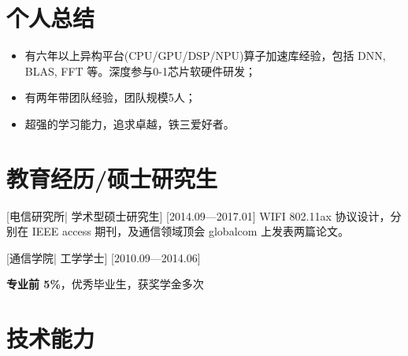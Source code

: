 \documentclass{resume}
\begin{document}


\ResumeTitle


\section{个人总结}

\begin{itemize}
  \item 有六年以上异构平台(CPU/GPU/DSP/NPU)算子加速库经验，包括 DNN, BLAS, FFT 等。深度参与0-1芯片软硬件研发；
  \item 有两年带团队经验，团队规模5人；
  \item 超强的学习能力，追求卓越，铁三爱好者。
\end{itemize}

\section{教育经历/硕士研究生}
[\textnormal{电信研究所|}  学术型硕士研究生]
[2014.09—2017.01]
WIFI 802.11ax 协议设计，分别在 IEEE access 期刊，及通信领域顶会 globalcom 上发表两篇论文。

\nocite{*} %
\printbibliography[heading={none}]



[\textnormal{通信学院|} 工学学士]
[2010.09—2014.06]

\textbf{专业前 5\%}，优秀毕业生，获奖学金多次

\section{技术能力}
\end{document}
